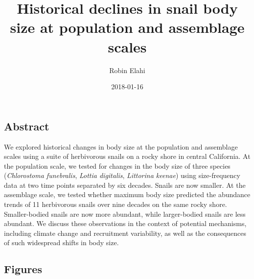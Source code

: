 \documentclass[11pt,]{article}
\title{Historical declines in snail body size at population and assemblage
scales}
\author{Robin Elahi}
\date{2018-01-16}
\begin{document}
\maketitle

\subsection{Abstract}\label{abstract}

We explored historical changes in body size at the population and
assemblage scales using a suite of herbivorous snails on a rocky shore
in central California. At the population scale, we tested for changes in
the body size of three species (\emph{Chlorostoma funebralis},
\emph{Lottia digitalis}, \emph{Littorina keenae}) using size-frequency
data at two time points separated by six decades. Snails are now
smaller. At the assemblage scale, we tested whether maximum body size
predicted the abundance trends of 11 herbivorous snails over nine
decades on the same rocky shore. Smaller-bodied snails are now more
abundant, while larger-bodied snails are less abundant. We discuss these
observations in the context of potential mechanisms, including climate
change and recruitment variability, as well as the consequences of such
widespread shifts in body size.

\newpage

\subsection{Figures}\label{figures}
\end{document}
